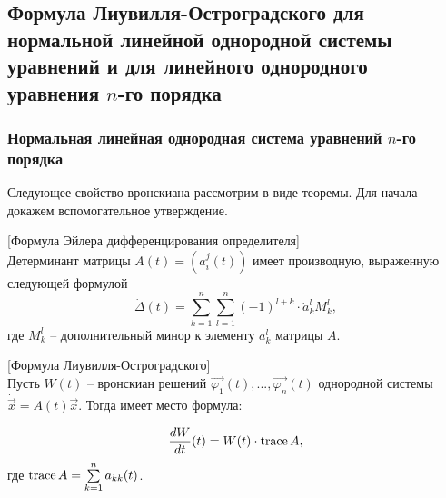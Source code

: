 \subsection{Формула Лиувилля-Остроградского для нормальной линейной однородной системы уравнений и для линейного однородного уравнения $n$-го порядка}

\subsubsection{Нормальная линейная однородная система уравнений $n$-го порядка}

Следующее свойство вронскиана рассмотрим в виде теоремы. Для начала докажем вспомогательное утверждение.

\begin{lemma}

[Формула Эйлера дифференцирования определителя]\\
Детерминант матрицы $A(t) = (a_i^j(t))$ имеет производную, выраженную следующей формулой
\[\dot{\Delta}(t) = \sum\limits_{k = 1}^n{\sum\limits_{l = 1}^n{(-1)^{l + k} \cdot \dot{a}_k^l} M_k^l},\]
где $M_k^l$ -- дополнительный минор к элементу $a_k^l$ матрицы $A$.

\end{lemma}

\begin{theorem}

[Формула Лиувилля-Остроградского]\\
Пусть $W(t)$ -- вронскиан решений $\overrightarrow{\varphi_1}(t), ..., \overrightarrow{\varphi_n}(t)$ однородной системы $\dot{\overrightarrow{x}} = A(t) \overrightarrow{x}$. Тогда имеет место формула:

\[\frac{dW}{dt}(t) = W(t) \cdot \operatorname{trace} A,\]
где $\operatorname{trace} A = \sum\limits_{k = 1}^n{a_{kk}(t)}$.

\end{theorem}

